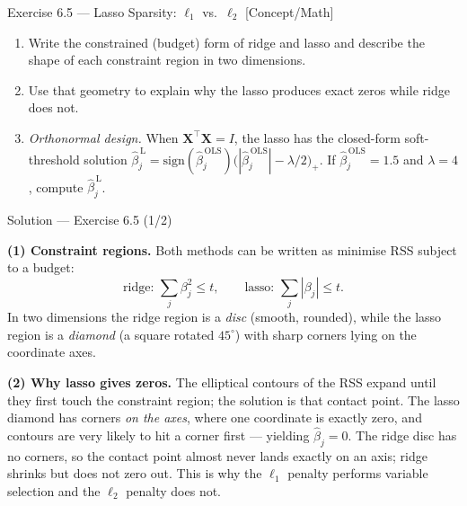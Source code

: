 \documentclass[aspectratio=169,11pt]{beamer}
\begin{document}
\begin{frame}{Exercise 6.5 --- Lasso Sparsity: $\ell_1$ vs.\ $\ell_2$ [Concept/Math]}
  \begin{exercise}
    \begin{enumerate}
      \item Write the constrained (budget) form of ridge and lasso and
            describe the shape of each constraint region in two
            dimensions.
      \item Use that geometry to explain why the lasso produces exact
            zeros while ridge does not.
      \item \emph{Orthonormal design.} When
            $\mathbf{X}^\top\mathbf{X} = I$, the lasso has the
            closed-form soft-threshold solution
            $\hat\beta_j^{\,\mathrm L} =
            \mathrm{sign}(\hat\beta_j^{\,\mathrm{OLS}})
            \bigl(|\hat\beta_j^{\,\mathrm{OLS}}| - \lambda/2\bigr)_{+}$.
            If $\hat\beta_j^{\,\mathrm{OLS}} = 1.5$ and $\lambda = 4$,
            compute $\hat\beta_j^{\,\mathrm L}$.
    \end{enumerate}
  \end{exercise}
\end{frame}

\begin{frame}{Solution --- Exercise 6.5 (1/2)}
  \begin{solutionbox}
    \textbf{(1) Constraint regions.}
    Both methods can be written as minimise RSS subject to a budget:
    \[
      \text{ridge: } \sum_j \beta_j^2 \le t,
      \qquad
      \text{lasso: } \sum_j |\beta_j| \le t .
    \]
    In two dimensions the ridge region is a \emph{disc} (smooth,
    rounded), while the lasso region is a \emph{diamond} (a square
    rotated $45^\circ$) with sharp corners lying on the coordinate axes.

    \textbf{(2) Why lasso gives zeros.}
    The elliptical contours of the RSS expand until they first touch the
    constraint region; the solution is that contact point. The lasso
    diamond has corners \emph{on the axes}, where one coordinate is
    exactly zero, and contours are very likely to hit a corner first ---
    yielding $\hat\beta_j = 0$. The ridge disc has no corners, so the
    contact point almost never lands exactly on an axis; ridge shrinks
    but does not zero out. This is why the $\ell_1$ penalty performs
    variable selection and the $\ell_2$ penalty does not.
  \end{solutionbox}
\end{frame}
\end{document}
